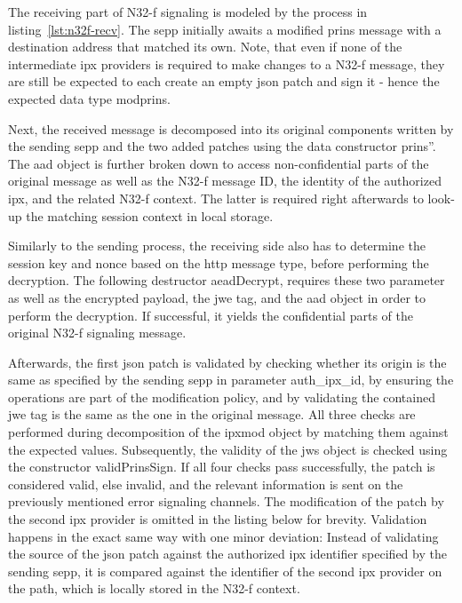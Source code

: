 The receiving part of N32-f signaling is modeled by the process in listing~\ref{lst:n32f-recv}.
The \gls{sepp} initially awaits a modified \gls{prins} message with a destination address that matched its own.
Note, that even if none of the intermediate \gls{ipx} providers is required to make changes to a N32-f message, they are still be expected to each create an empty \gls{json} patch and sign it - hence the expected data type {\sffamily modprins}.

Next, the received message is decomposed into its original components written by the sending \gls{sepp} and the two added patches using the data constructor {\sffamily prins''}.
The \gls{aad} object is further broken down to access non-confidential parts of the original message as well as the N32-f message ID, the identity of the authorized \gls{ipx}, and the related N32-f context.
The latter is required right afterwards to look-up the matching session context in local storage.

Similarly to the sending process, the receiving side also has to determine the session key and nonce based on the \gls{http} message type, before performing the decryption.
The following destructor {\sffamily aeadDecrypt}, requires these two parameter as well as the encrypted payload, the \gls{jwe} tag, and the \gls{aad} object in order to perform the decryption.
If successful, it yields the confidential parts of the original N32-f signaling message.

Afterwards, the first \gls{json} patch is validated by checking whether its origin is the same as specified by the sending \gls{sepp} in parameter {\sffamily auth\_ipx\_id}, by ensuring the operations are part of the modification policy, and by validating the contained \gls{jwe} tag is the same as the one in the original message.
All three checks are performed during decomposition of the {\sffamily ipxmod} object by matching them against the expected values.
Subsequently, the validity of the \gls{jws} object is checked using the constructor {\sffamily validPrinsSign}.
If all four checks pass successfully, the patch is considered valid, else invalid, and the relevant information is sent on the previously mentioned error signaling channels.
The modification of the patch by the second \gls{ipx} provider is omitted in the listing below for brevity.
Validation happens in the exact same way with one minor deviation: Instead of validating the source of the \gls{json} patch against the authorized \gls{ipx} identifier specified by the sending \gls{sepp}, it is compared against the identifier of the second \gls{ipx} provider on the path, which is locally stored in the N32-f context.

